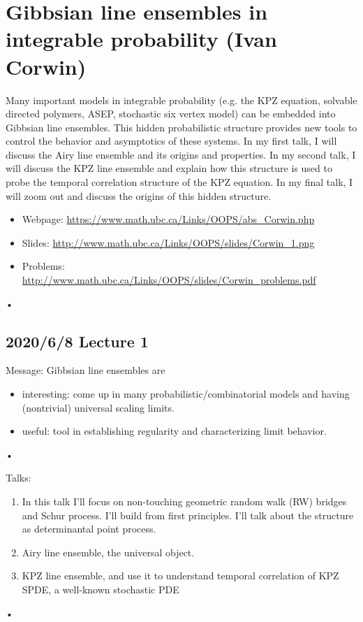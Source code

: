 
\section{Gibbsian line ensembles in integrable probability (Ivan Corwin)}

Many important models in integrable probability (e.g. the KPZ equation, solvable directed polymers, ASEP, stochastic six vertex model) can be embedded into Gibbsian line ensembles. This hidden probabilistic structure provides new tools to control the behavior and asymptotics of these systems. In my first talk, I will discuss the Airy line ensemble and its origins and properties. In my second talk, I will discuss the KPZ line ensemble and explain how this structure is used to probe the temporal correlation structure of the KPZ equation. In my final talk, I will zoom out and discuss the origins of this hidden structure. 

\begin{itemize}
\item
Webpage: \url{https://www.math.ubc.ca/Links/OOPS/abs_Corwin.php}
\item
Slides: \url{http://www.math.ubc.ca/Links/OOPS/slides/Corwin_1.png}
\item
Problems: \url{http://www.math.ubc.ca/Links/OOPS/slides/Corwin_problems.pdf}
\end{itemize}•

\subsection*{2020/6/8 Lecture 1}

Message: Gibbsian line ensembles are
\begin{itemize}
\item
interesting: come up in many probabilistic/combinatorial models and having (nontrivial) universal scaling limits.
\item
useful: tool in establishing regularity and characterizing limit behavior. %
\end{itemize}•

Talks:
\begin{enumerate}
\item
In this talk I'll focus on non-touching geometric random walk (RW) bridges and Schur process. I'll build from first principles. 
I'll talk about the structure as determinantal point process.
\item
Airy line ensemble, the universal object.
\item
KPZ line ensemble, and use it to understand temporal correlation of KPZ SPDE, a well-known stochastic PDE
\end{enumerate}•

